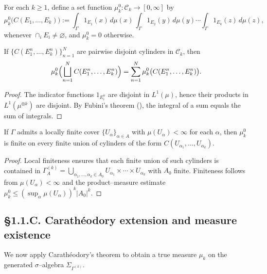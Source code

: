 \begin{definition}
For each $k\ge1$, define a set function $\mu_k^0:\mathscr C_k\to[0,\infty]$ by
\[
\mu_k^0\bigl(C(E_1,\ldots,E_k)\bigr)
  := \int_\Gamma 1_{E_1}(x)\,d\mu(x)\,
     \int_\Gamma 1_{E_2}(y)\,d\mu(y)\cdots
     \int_\Gamma 1_{E_k}(z)\,d\mu(z),
\]
whenever $\cap_i E_i\neq\varnothing$, and $\mu_k^0=0$ otherwise.
\]
\end{definition}

\begin{lemma}\label{lem:1.1.add}
If $\{C(E^n_1,\ldots,E^n_k)\}_{n=1}^N$ are pairwise disjoint cylinders in $\mathscr C_k$, then
\[
\mu_k^0\Bigl(\bigsqcup_{n=1}^N C(E^n_1,\ldots,E^n_k)\Bigr)
=\sum_{n=1}^N \mu_k^0\bigl(C(E^n_1,\ldots,E^n_k)\bigr).
\]
\end{lemma}

\begin{proof}
The indicator functions $1_{E^n_i}$ are disjoint in $L^1(\mu)$, hence their products in $L^1(\mu^{\otimes k})$ are disjoint. 
By Fubini’s theorem (\cite{Halmos,Bogachev1}), the integral of a sum equals the sum of integrals.
\end{proof}

\begin{lemma}\label{lem:1.1.fin}
If $\Gamma$ admits a locally finite cover $\{U_\alpha\}_{\alpha\in A}$ with $\mu(U_\alpha)<\infty$ for each $\alpha$, then $\mu_k^0$ is finite on every finite union of cylinders of the form $C(U_{\alpha_1},\ldots,U_{\alpha_k})$.
\end{lemma}

\begin{proof}
Local finiteness ensures that each finite union of such cylinders is contained in $\Gamma^{(k)}_A=\bigcup_{\alpha_1,\ldots,\alpha_k\in A_0}U_{\alpha_1}\times\cdots\times U_{\alpha_k}$ with $A_0$ finite. 
Finiteness follows from $\mu(U_\alpha)<\infty$ and the product–measure estimate $\mu_k^0\le(\sup_\alpha\mu(U_\alpha))^k|A_0|^k$.
\end{proof}

\subsection*{§1.1.C. Carathéodory extension and measure existence}

We now apply Carathéodory’s theorem to obtain a true measure $\mu_k$ on the generated $\sigma$–algebra $\Sigma_{\Gamma^{(k)}}$.

